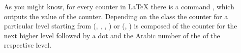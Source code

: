 \begin{Declaration}
\end{Declaration}%
%
As you might know, for every counter in {\LaTeX} there is a command
, which outputs the value of the
counter. Depending on the class the counter for a particular level
starting from  (, ,
, ) or 
(, ) is composed of the counter for the
next higher level followed by a dot and the Arabic number of the
 of the respective level.\par
%
%

